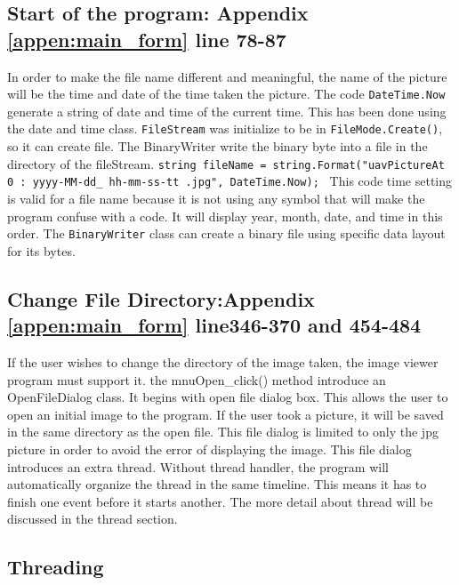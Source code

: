 \subsection{Start of the program: Appendix \ref{appen:main_form} line 78-87}%
In order to make the file name different and meaningful, the name of the picture will be the time and date of the time taken the picture. The code \texttt{DateTime.Now} generate a string of date and time of the current time. This has been done using the date and time class. \texttt{FileStream} was initialize to be in \texttt{FileMode.Create()}, so it can create file. The BinaryWriter write the binary byte into a file in the directory of the fileStream. \texttt{string fileName = string.Format("uavPictureAt{ 0 : yyyy-MM-dd\_ hh-mm-ss-tt}
 .jpg", DateTime.Now);   }  
This code time setting is valid for a file name because it is not using any symbol that will make the program confuse with a code. 
It will display year, month, date, and time in this order. 
The \texttt{BinaryWriter} class can create a binary file using specific data layout for its bytes. 

\subsection{Change File Directory:Appendix \ref{appen:main_form} line346-370 and 454-484 }%
If the user wishes to change the directory of the image taken, the image viewer program must support it. the mnuOpen\_click() method introduce an OpenFileDialog class. It begins with open file dialog box. This allows the user to open an initial image to the program. If the user took a picture, it will be saved in the same directory as the open file. This file dialog is limited to only the jpg picture in order to avoid the error of displaying the image. 
This file dialog introduces an extra thread. Without thread handler, the program will automatically organize the thread in the same timeline. This means it has to finish one event before it starts another. The more detail about thread will be discussed in the thread section. 

\subsection{Threading}

